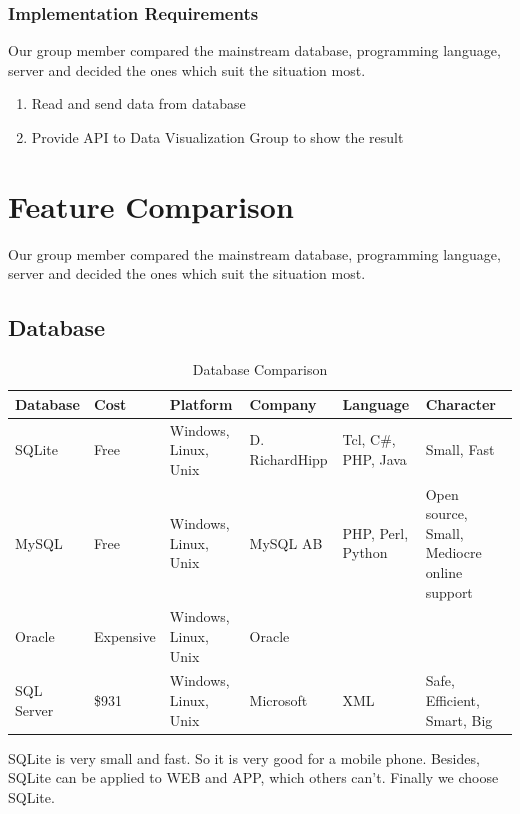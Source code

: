 \documentclass{article}
\begin{document}
\subsubsection{Implementation Requirements}
Our group member compared the mainstream database, programming language, server and decided the ones which suit the situation most. 

\begin{enumerate}
	\item Read and send data from database
	\item Provide API to Data Visualization Group to show the result
\end{enumerate}


\section{Feature Comparison}
Our group member compared the mainstream database, programming language, server and decided the ones which suit the situation most. 
\subsection{Database}

\begin{table}[htbp]
\centering
  \begin{tabular}{|l|l|p{2cm}|p{2cm}|p{2cm}|p{2cm}|}
  \hline
   Database & Cost & Platform & Company & Language & Character\\
    \hline
   SQLite & Free & Windows, Linux, Unix & D. RichardHipp & Tcl, C\#, PHP, Java & Small, Fast\\
    \hline

   MySQL & Free & Windows, Linux, Unix & MySQL AB & PHP, Perl, Python & Open source, Small, Mediocre online support \\
       \hline

   Oracle & Expensive & Windows, Linux, Unix & Oracle & &\\   
       \hline
	SQL Server & \$931 & Windows, Linux, Unix & Microsoft & XML & Safe, Efficient, Smart, Big \\
	\hline
     \end{tabular}
  \caption{Database Comparison}
\end{table}

SQLite is very small and fast. So it is very good for a mobile phone. Besides, SQLite can be applied to WEB and APP, which others can’t. Finally we choose SQLite.
\end{document}
